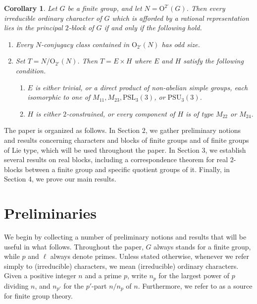 \documentclass[10pt]{article}
\newtheorem{maincor}[mainthm]{Corollary}
\begin{document}
\begin{maincor}\label{corB}
	Let $G$ be a finite group, and let $N=\mathrm{O}^{2'}(G)$.
  Then every irreducible ordinary character of $G$ which is afforded by a rational representation
  lies in the principal $2$-block of $G$
   if and only if 
  the following hold.
  \begin{enumerate}[\rm (1)]
    			\item  Every $N$-conjugacy class contained in $\mathrm{O}_{2'}(N)$ has odd size. 
     \item Set $T=N/\mathrm{O}_{2'}(N)$. 
     Then $T=E\times H$ where $E$ and $H$ satisfy the following condition.
     \begin{enumerate}[\rm (i)]
        \item $E$ is either trivial, or a direct product of non-abelian simple groups,
      each isomorphic to one of $M_{11}, M_{23}, \mathrm{PSL}_3(3)$, or $\mathrm{PSU}_3(3)$.
\item $H$ is either $2$-constrained, or every component of $H$ is 
    of type $M_{22}$ or $M_{24}$.
     \end{enumerate}
  \end{enumerate}
\end{maincor}



The paper is organized as follows. 
In Section 2, we gather preliminary notions and results concerning characters and blocks of finite groups and of finite groups of Lie type, which will be used throughout the paper.
In Section 3, 
we establish several results on real blocks, including a correspondence theorem for real $2$-blocks 
between a finite group and specific quotient groups of it.
Finally, in Section 4, we prove our main results.






\section{Preliminaries}

We begin by collecting a number of preliminary notions and results that will be useful in what follows.
Throughout the paper, $G$ always stands for a finite group, while $p$ and $\ell$ always denote primes.
Unless stated otherwise, whenever we refer simply to (irreducible) characters, we mean (irreducible) ordinary characters.
Given a positive integer $n$ and a prime $p$, write $n_p$ for the largest power of $p$ dividing $n$, and $n_{p'}$ for the $p'$-part $n/n_p$ of $n$.
Furthermore, we refer to \cite{huppert67} as a source for finite group theory.
\end{document}
